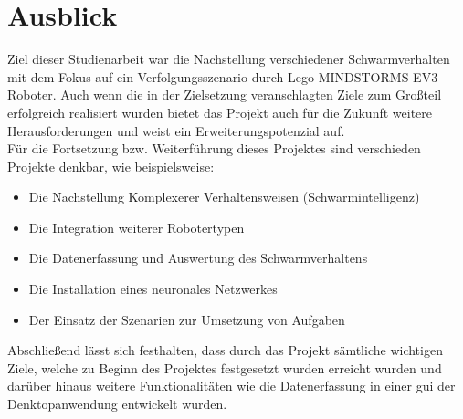 \section{Ausblick}
Ziel dieser Studienarbeit war die Nachstellung verschiedener Schwarmverhalten mit dem Fokus auf ein Verfolgungsszenario durch Lego MINDSTORMS EV3-Roboter.
Auch wenn die in der Zielsetzung veranschlagten Ziele zum Großteil erfolgreich realisiert wurden bietet das Projekt auch für die Zukunft weitere
Herausforderungen und weist ein Erweiterungspotenzial auf. \\
Für die Fortsetzung bzw. Weiterführung dieses Projektes sind verschieden Projekte denkbar, wie beispielsweise:
\begin{itemize}
	\item Die Nachstellung Komplexerer Verhaltensweisen (Schwarmintelligenz)
	\item Die Integration weiterer Robotertypen
	\item Die Datenerfassung und Auswertung des Schwarmverhaltens
	\item Die Installation eines neuronales Netzwerkes
	\item Der Einsatz der Szenarien zur Umsetzung von Aufgaben 
\end{itemize}
Abschließend lässt sich festhalten, dass durch das Projekt sämtliche wichtigen Ziele, welche zu Beginn des Projektes festgesetzt wurden erreicht wurden und darüber hinaus weitere Funktionalitäten wie die Datenerfassung in einer \gls{gui} der Denktopanwendung entwickelt wurden.